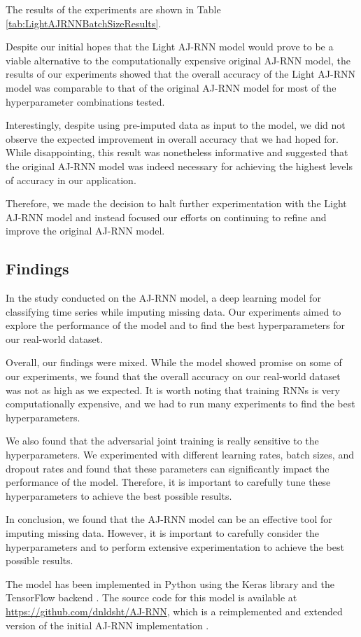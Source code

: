 The results of the experiments are shown in Table \ref{tab:LightAJRNNBatchSizeResults}.

Despite our initial hopes that the Light AJ-RNN model would prove to be a viable alternative to the computationally expensive original AJ-RNN model, the results of our experiments showed that the overall accuracy of the Light AJ-RNN model was comparable to that of the original AJ-RNN model for most of the hyperparameter combinations tested.

Interestingly, despite using pre-imputed data as input to the model, we did not observe the expected improvement in overall accuracy that we had hoped for. 
While disappointing, this result was nonetheless informative and suggested that the original AJ-RNN model was indeed necessary for achieving the highest levels of accuracy in our application.

Therefore, we made the decision to halt further experimentation with the Light AJ-RNN model and instead focused our efforts on continuing to refine and improve the original AJ-RNN model. 


\subsection{Findings}

In the study conducted on the AJ-RNN model, a deep learning model for classifying time series while imputing missing data.
Our experiments aimed to explore the performance of the model and to find the best hyperparameters for our real-world dataset.

Overall, our findings were mixed. 
While the model showed promise on some of our experiments, we found that the overall accuracy on our real-world dataset was not as high as we expected.
It is worth noting that training RNNs is very computationally expensive, and we had to run many experiments to find the best hyperparameters.

We also found that the adversarial joint training is really sensitive to the hyperparameters.
We experimented with different learning rates, batch sizes, and dropout rates and found that these parameters can significantly impact the performance of the model.
Therefore, it is important to carefully tune these hyperparameters to achieve the best possible results.

In conclusion, we found that the AJ-RNN model can be an effective tool for imputing missing data. 
However, it is important to carefully consider the hyperparameters and to perform extensive experimentation to achieve the best possible results.

The model has been implemented in Python using the Keras library \cite{chollet2015keras} and the TensorFlow backend \cite{tensorflow2015-whitepaper}.
The source code for this model is available at \url{https://github.com/dnldsht/AJ-RNN}, which is a reimplemented and extended version of the initial AJ-RNN implementation \cite{ajrnn}.